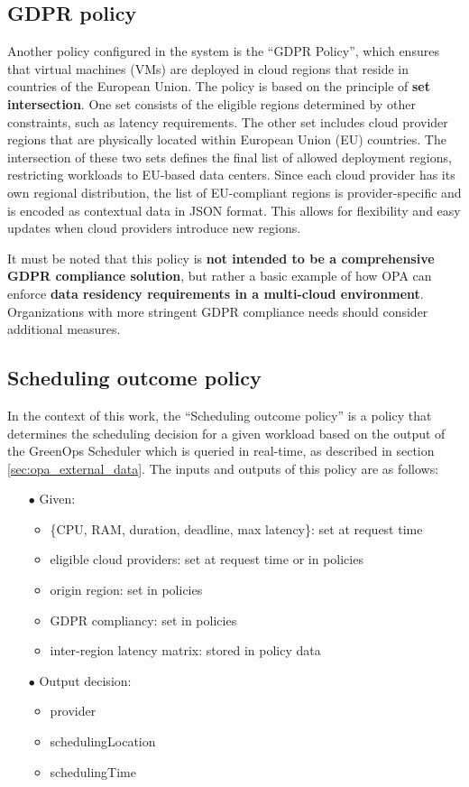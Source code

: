 \subsection{GDPR policy}

Another policy configured in the system is the ``GDPR Policy'', which ensures that virtual machines (VMs) are deployed in cloud regions that reside in countries of the European Union. 
The policy is based on the principle of \textbf{set intersection}. One set consists of the eligible regions determined by other constraints, such as latency requirements. The other set includes cloud provider regions that are physically located within European Union (EU) countries.
The intersection of these two sets defines the final list of allowed deployment regions, restricting workloads to EU-based data centers.
Since each cloud provider has its own regional distribution, the list of EU-compliant regions is provider-specific and is encoded as contextual data in JSON format. This allows for flexibility and easy updates when cloud providers introduce new regions.

It must be noted that this policy is \textbf{not intended to be a comprehensive GDPR compliance solution}, but rather a basic example of how OPA can enforce \textbf{data residency requirements in a multi-cloud environment}. Organizations with more stringent GDPR compliance needs should consider additional measures.

\subsection{Scheduling outcome policy}
\label{sec:scheduling_outcome_policy}

In the context of this work, the ``Scheduling outcome policy'' is a policy that determines the scheduling decision for a given workload based on the output of the GreenOps Scheduler which is queried in real-time, as described in section \ref{sec:opa_external_data}.
The inputs and outputs of this policy are as follows:

\begin{itemize}[itemsep=0.2pt, topsep=0.2pt]
  \item[$\bullet$] Given:
  \begin{itemize}[label=$\circ$]
    \item \{CPU, RAM, duration, deadline, max latency\}: set at request time
    \item eligible cloud providers: set at request time or in policies
    \item origin region: set in policies
    \item GDPR compliancy: set in policies
    \item inter-region latency matrix: stored in policy data
  \end{itemize}
  \item[$\bullet$] Output decision:
  \begin{itemize}[label=$\circ$]
    \item provider
    \item schedulingLocation
    \item schedulingTime
  \end{itemize}
\end{itemize}

